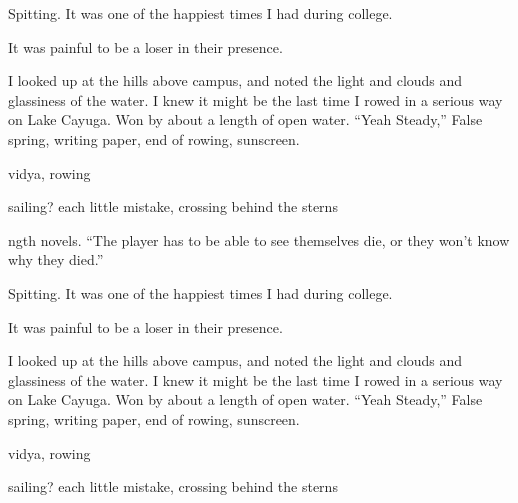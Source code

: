 	Spitting.  It was one of the happiest times I had during college.
	

It was painful to be a loser in their presence.  

I looked up at the hills above campus, and noted the light and clouds and
glassiness of the water.  I knew it might be the last time I rowed in a serious
way on Lake Cayuga.  Won by about a length of open water.  ``Yeah Steady,'' False
spring, writing paper, end of rowing, sunscreen.

vidya, rowing

 sailing?  each little mistake, crossing behind the sterns



	

ngth novels.  ``The player has to be able to see themselves die, or they won't
know why they died.'' 

	Spitting.  It was one of the happiest times I had during college.
	

It was painful to be a loser in their presence.  

I looked up at the hills above campus, and noted the light and clouds and
glassiness of the water.  I knew it might be the last time I rowed in a serious
way on Lake Cayuga.  Won by about a length of open water.  ``Yeah Steady,'' False
spring, writing paper, end of rowing, sunscreen.

vidya, rowing

 sailing?  each little mistake, crossing behind the sterns



	




